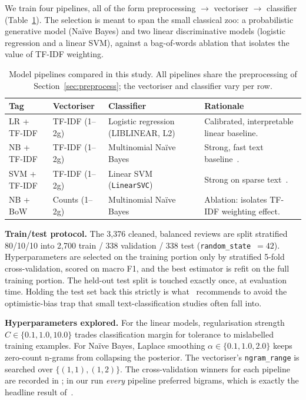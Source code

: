 \documentclass[11pt]{article}
\begin{document}
We train four pipelines, all of the form preprocessing $\to$ vectoriser $\to$ classifier (Table~\ref{tab:models}). The selection is meant to span the small classical zoo: a probabilistic generative model (Na\"ive Bayes) and two linear discriminative models (logistic regression and a linear SVM), against a bag-of-words ablation that isolates the value of TF-IDF weighting.

\begin{table}[ht]
  \centering
  \footnotesize
  \caption{Model pipelines compared in this study. All pipelines share the preprocessing of Section~\ref{sec:preprocess}; the vectoriser and classifier vary per row.}
  \label{tab:models}
  \begin{tabularx}{\linewidth}{@{}lllX@{}}
    \toprule
    Tag & Vectoriser & Classifier & Rationale \\
    \midrule
    LR + TF-IDF & TF-IDF (1--2g) & Logistic regression (LIBLINEAR, L2) & Calibrated, interpretable linear baseline. \\
    NB + TF-IDF & TF-IDF (1--2g) & Multinomial Na\"ive Bayes & Strong, fast text baseline~\citep{mccallum_nigam_1998}. \\
    SVM + TF-IDF & TF-IDF (1--2g) & Linear SVM (\texttt{LinearSVC}) & Strong on sparse text~\citep{joachims_1998}. \\
    NB + BoW & Counts (1--2g) & Multinomial Na\"ive Bayes & Ablation: isolates TF-IDF weighting effect. \\
    \bottomrule
  \end{tabularx}
\end{table}

\textbf{Train/test protocol.} The 3{,}376 cleaned, balanced reviews are split stratified 80/10/10 into 2{,}700 train / 338 validation / 338 test (\texttt{random\_state}~$=42$). Hyperparameters are selected on the training portion only by stratified 5-fold cross-validation, scored on macro F1, and the best estimator is refit on the full training portion. The held-out test split is touched exactly once, at evaluation time. Holding the test set back this strictly is what~\citet{joachims_1998} recommends to avoid the optimistic-bias trap that small text-classification studies often fall into.

\textbf{Hyperparameters explored.} For the linear models, regularisation strength $C \in \{0.1, 1.0, 10.0\}$ trades classification margin for tolerance to mislabelled training examples. For Na\"ive Bayes, Laplace smoothing $\alpha \in \{0.1, 1.0, 2.0\}$ keeps zero-count n-grams from collapsing the posterior. The vectoriser's \texttt{ngram\_range} is searched over $\{(1,1), (1,2)\}$. The cross-validation winners for each pipeline are recorded in ; in our run \emph{every} pipeline preferred bigrams, which is exactly the headline result of~\citet{wang_manning_2012}.
\end{document}
